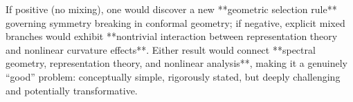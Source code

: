 If positive (no mixing), one would discover a new **geometric selection rule** governing symmetry breaking in conformal geometry; if negative, explicit mixed branches would exhibit **nontrivial interaction between representation theory and nonlinear curvature effects**.  
Either result would connect **spectral geometry, representation theory, and nonlinear analysis**, making it a genuinely “good” problem: conceptually simple, rigorously stated, but deeply challenging and potentially transformative.